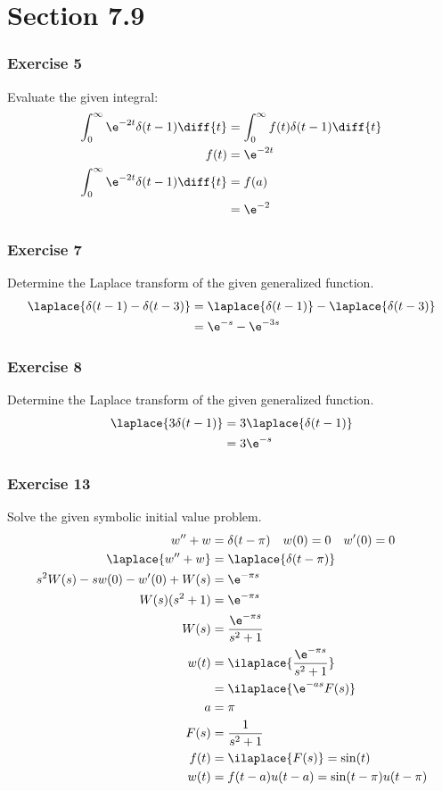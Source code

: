 \documentclass{math}
\begin{document}
\section*{Section 7.9}

\subsubsection*{Exercise 5}
Evaluate the given integral:
\begin{align*}
  \int_{0}^{\infty}\e^{-2t}\delta(t-1)\diff{t} &=
    \int_{0}^{\infty}f(t)\delta(t-1)\diff{t} \\
  f(t) &= \e^{-2t} \\
  \int_{0}^{\infty}\e^{-2t}\delta(t-1)\diff{t} &= f(a) \\
  &= \e^{-2}
\end{align*}

\subsubsection*{Exercise 7}
Determine the Laplace transform of the given generalized function.
\begin{align*}
  \laplace{\delta(t-1)-\delta(t-3)} &=
    \laplace{\delta(t-1)}-\laplace{\delta(t-3)} \\
  &= \e^{-s}-\e^{-3s}
\end{align*}

\subsubsection*{Exercise 8}
Determine the Laplace transform of the given generalized function.
\begin{align*}
  \laplace{3\delta(t-1)} &= 3\laplace{\delta(t-1)} \\
  &= 3\e^{-s}
\end{align*}

\subsubsection*{Exercise 13}
Solve the given symbolic initial value problem.
\begin{align*}
  w''+w &= \delta(t-\pi) \quad w(0) = 0 \quad w'(0) = 0 \\
  \laplace{w''+w} &= \laplace{\delta(t-\pi)} \\
  s^2W(s)-sw(0)-w'(0)+W(s) &= \e^{-\pi s} \\
  W(s)(s^2+1) &= \e^{-\pi s} \\
  W(s) &= \frac{\e^{-\pi s}}{s^2+1} \\
  w(t) &= \ilaplace{\frac{\e^{-\pi s}}{s^2+1}} \\
  &= \ilaplace{\e^{-as}F(s)} \\
  a &= \pi \\
  F(s) &= \frac{1}{s^2+1} \\
  f(t) &= \ilaplace{F(s)} = \sin(t) \\
  w(t) &= f(t-a)u(t-a) = \sin(t-\pi)u(t-\pi)
\end{align*}
\end{document}
